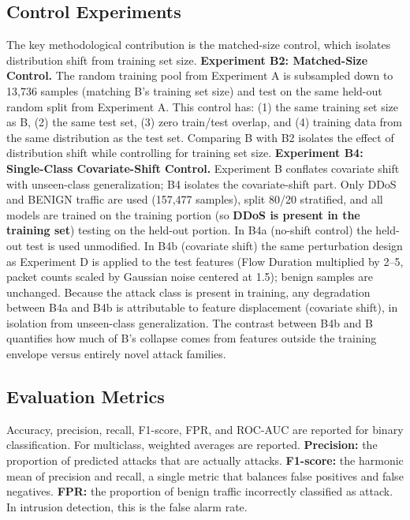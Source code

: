 \documentclass[10pt]{article}
\begin{document}
\subsection{Control Experiments}
The key methodological contribution is the matched-size control, which isolates distribution shift from training set size.
\textbf{Experiment B2: Matched-Size Control.} The random training pool from Experiment A is subsampled down to 13,736 samples (matching B's training set size) and test on the same held-out random split from Experiment A. This control has: (1) the same training set size as B, (2) the same test set, (3) zero train/test overlap, and (4) training data from the same distribution as the test set. Comparing B with B2 isolates the effect of distribution shift while controlling for training set size.
\textbf{Experiment B4: Single-Class Covariate-Shift Control.} Experiment B conflates covariate shift with unseen-class generalization; B4 isolates the covariate-shift part. Only DDoS and BENIGN traffic are used (157,477 samples), split 80/20 stratified, and all models are trained on the training portion (so \textbf{DDoS is present in the training set}) testing on the held-out portion. In B4a (no-shift control) the held-out test is used unmodified. In B4b (covariate shift) the same perturbation design as Experiment D is applied to the test features (Flow Duration multiplied by 2--5, packet counts scaled by Gaussian noise centered at 1.5); benign samples are unchanged. Because the attack class is present in training, any degradation between B4a and B4b is attributable to feature displacement (covariate shift), in isolation from unseen-class generalization. The contrast between B4b and B quantifies how much of B's collapse comes from features outside the training envelope versus entirely novel attack families.
\subsection{Evaluation Metrics}
Accuracy, precision, recall, F1-score, FPR, and ROC-AUC are reported for binary classification. For multiclass, weighted averages are reported.
\textbf{Precision:} the proportion of predicted attacks that are actually attacks.
\textbf{F1-score:} the harmonic mean of precision and recall, a single metric that balances false positives and false negatives.
\textbf{FPR:} the proportion of benign traffic incorrectly classified as attack. In intrusion detection, this is the false alarm rate.
\end{document}
